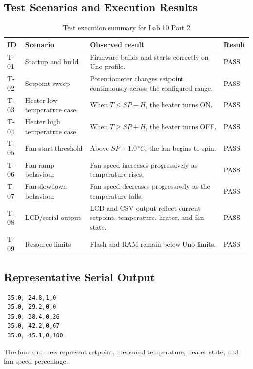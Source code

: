 \documentclass[12pt]{article}
\begin{document}
\subsection{Test Scenarios and Execution Results}

\begin{table}[H]
\centering
\small
\begin{tabular}{p{0.8cm} p{3.2cm} p{6.0cm} p{1.3cm}}
\toprule
\textbf{ID} & \textbf{Scenario} & \textbf{Observed result} & \textbf{Result} \\
\midrule
T-01 & Startup and build & Firmware builds and starts correctly on Uno profile. & PASS \\
T-02 & Setpoint sweep & Potentiometer changes setpoint continuously across the configured range. & PASS \\
T-03 & Heater low temperature case & When \(T \le SP-H\), the heater turns ON. & PASS \\
T-04 & Heater high temperature case & When \(T \ge SP+H\), the heater turns OFF. & PASS \\
T-05 & Fan start threshold & Above \(SP+1.0\,^{\circ}C\), the fan begins to spin. & PASS \\
T-06 & Fan ramp behaviour & Fan speed increases progressively as temperature rises. & PASS \\
T-07 & Fan slowdown behaviour & Fan speed decreases progressively as the temperature falls. & PASS \\
T-08 & LCD/serial output & LCD and CSV output reflect current setpoint, temperature, heater, and fan state. & PASS \\
T-09 & Resource limits & Flash and RAM remain below Uno limits. & PASS \\
\bottomrule
\end{tabular}
\caption{Test execution summary for Lab 10 Part 2}
\label{tab:testresults}
\end{table}

\subsection{Representative Serial Output}

\begin{verbatim}
 35.0, 24.8,1,0
 35.0, 29.2,0,0
 35.0, 38.4,0,26
 35.0, 42.2,0,67
 35.0, 45.1,0,100
\end{verbatim}

\hspace{0.8cm} The four channels represent setpoint, measured temperature, heater state, and fan speed percentage.
\end{document}
